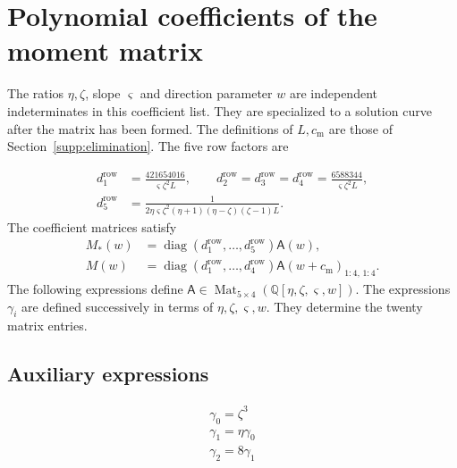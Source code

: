 \clearpage
\section{Polynomial coefficients of the moment matrix}\label{supp:momentcoefficients}

The ratios $\eta,\zeta$, slope $\varsigma$ and direction parameter
$w$ are independent indeterminates in this coefficient list. They
are specialized to a solution curve after the matrix has been
formed. The definitions of $L,c_{\mathrm m}$ are those of
Section~\ref{supp:elimination}. The five row factors are

\[
\begin{aligned}
 d_{1}^{\mathrm{row}}&=\frac{421654016}{\varsigma \zeta ^2L},\qquad
 d_{2}^{\mathrm{row}}=d_{3}^{\mathrm{row}}=d_{4}^{\mathrm{row}}=\frac{6588344}{\varsigma \zeta ^2L},\\
 d_{5}^{\mathrm{row}}&=\frac{1}{2\eta \varsigma \zeta ^2(\eta +1)(\eta -\zeta )(\zeta -1)L}.
\end{aligned}
\]
The coefficient matrices satisfy
\[
\begin{aligned}
 M_*(w)&=\operatorname{diag}(d_{1}^{\mathrm{row}},\ldots,d_{5}^{\mathrm{row}})\mathsf A(w),\\
 M(w)&=\operatorname{diag}(d_{1}^{\mathrm{row}},\ldots,d_{4}^{\mathrm{row}})\mathsf A(w+c_{\mathrm m})_{1:4,\,1:4}.
\end{aligned}
\]
The following expressions define
$\mathsf A\in\operatorname{Mat}_{5\times4}(\mathbb Q[\eta ,\zeta ,\varsigma ,w])$.
The expressions $\gamma_i$ are defined successively in terms of
$\eta,\zeta,\varsigma,w$. They determine the twenty matrix entries.

\subsection{Auxiliary expressions}
\begingroup\small
\setlength{\abovedisplayskip}{5pt}
\setlength{\belowdisplayskip}{5pt}


\[\begin{aligned}\gamma_{0}=\zeta ^{3}\\ \gamma_{1}=\eta  \gamma_{0}\\ \gamma_{2}=8 \gamma_{1}\end{aligned}\]

